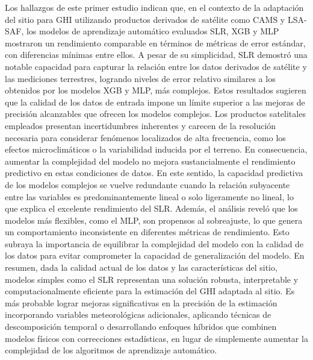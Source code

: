 

Los hallazgos de este primer estudio indican que, en el contexto de la adaptación del sitio para GHI utilizando productos derivados de satélite como CAMS y LSA-SAF, los modelos de aprendizaje automático evaluados SLR, XGB y MLP mostraron un rendimiento comparable en términos de métricas de error estándar, con diferencias mínimas entre ellos. A pesar de su simplicidad, SLR demostró una notable capacidad para capturar la relación entre los datos derivados de satélite y las mediciones terrestres, logrando niveles de error relativo similares a los obtenidos por los modelos XGB y MLP, más complejos.
Estos resultados sugieren que la calidad de los datos de entrada impone un límite superior a las mejoras de precisión alcanzables que ofrecen los modelos complejos. Los productos satelitales empleados presentan incertidumbres inherentes y carecen de la resolución necesaria para considerar fenómenos localizados de alta frecuencia, como los efectos microclimáticos o la variabilidad inducida por el terreno. En consecuencia, aumentar la complejidad del modelo no mejora sustancialmente el rendimiento predictivo en estas condiciones de datos. En este sentido, la capacidad predictiva de los modelos complejos se vuelve redundante cuando la relación subyacente entre las variables es predominantemente lineal o solo ligeramente no lineal, lo que explica el excelente rendimiento del SLR.
Además, el análisis reveló que los modelos más flexibles, como el MLP, son propensos al sobreajuste, lo que genera un comportamiento inconsistente en diferentes métricas de rendimiento. Esto subraya la importancia de equilibrar la complejidad del modelo con la calidad de los datos para evitar comprometer la capacidad de generalización del modelo. En resumen, dada la calidad actual de los datos y las características del sitio, modelos simples como el SLR representan una solución robusta, interpretable y computacionalmente eficiente para la estimación del GHI adaptada al sitio. Es más probable lograr mejoras significativas en la precisión de la estimación incorporando variables meteorológicas adicionales, aplicando técnicas de descomposición temporal o desarrollando enfoques híbridos que combinen modelos físicos con correcciones estadísticas, en lugar de simplemente aumentar la complejidad de los algoritmos de aprendizaje automático.

